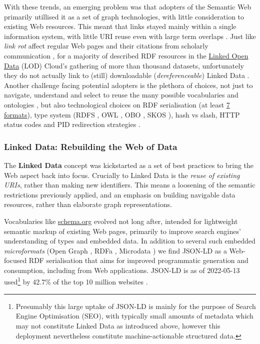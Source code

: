\documentclass[fleqn,10pt,lineno]{wlpeerjlua}
\begin{document}
With these trends, an emerging problem was that adopters of the Semantic Web primarily utillised it as a set of graph technologies, with little consideration to existing Web resources. This meant that links stayed mainly within a single information system, with little URI reuse even with large term overlaps \cite{9CdJnsoJ}. Just like \emph{link rot} affect regular Web pages and their citations from scholarly communication \cite{AGHR9oyr}, for a majority of described RDF resources in the \href{https://lod-cloud.net/}{Linked Open Data} (LOD) Cloud's gathering of more than thousand datasets, unfortunately they do not actually link to (still) downloadable (\emph{dereferenceable}) Linked Data \cite{5SuwLNdE}. Another challenge facing potential adopters is the plethora of choices, not just to navigate, understand and select to reuse the many possible vocabularies and ontologies \cite{TUmA4KQT}, but also technological choices on RDF serialisation (at least \href{https://www.w3.org/TR/rdf11-primer/\#section-graph-syntax}{7 formats}), type system (RDFS \cite{ZwAcGQKY}, OWL \cite{1p4IWJpI}, OBO \cite{1DalZuKct}, SKOS \cite{15gQDya5B}), hash vs slash, HTTP status codes and PID redirection strategies \cite{rnzJ4khD}.

\hypertarget{sec:ld-web}{%
\subsubsection*{Linked Data: Rebuilding the Web of Data}\label{sec:ld-web}}

The \textbf{Linked Data} concept \cite{19s3yyxDn} was kickstarted as a set of best practices \cite{OGXYtGZ8} to bring the Web aspect back into focus. Crucially to Linked Data is the \emph{reuse of existing URIs}, rather than making new identifiers. This means a loosening of the semantic restrictions previously applied, and an emphasis on building navigable data resources, rather than elaborate graph representations.

Vocabularies like \href{https://schema.org/}{schema.org} evolved not long after, intended for lightweight semantic markup of existing Web pages, primarily to improve search engines' understanding of types and embedded data. In addition to several such embedded \emph{microformats} (Open Graph \cite{oN9D5LkD}, RDFa \cite{FKIF6ApB}, Microdata \cite{14Utscfe4}) we find JSON-LD \cite{X5SWPqSU} as a Web-focused RDF serialisation that aims for improved programmatic generation and consumption, including from Web applications. JSON-LD is as of 2022-05-13 used\footnote{Presumably this large uptake of JSON-LD is mainly for the purpose of Search Engine Optimisation (SEO), with typically small amounts of metadata which may not constitute Linked Data as introduced above, however this deployment nevertheless constitute machine-actionable structured data.} by 42.7\% of the top 10 million websites \cite{j3SqQLBR}.
\end{document}
